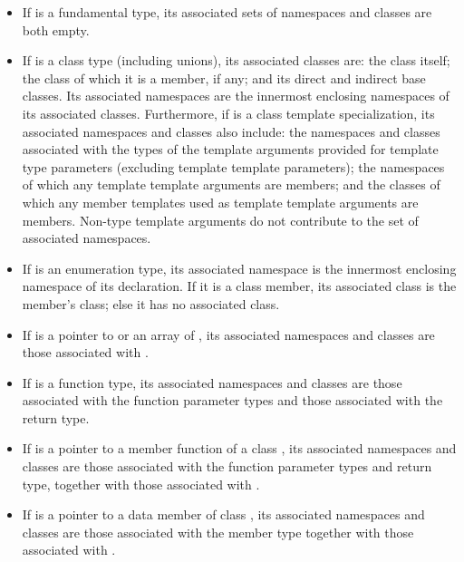 \begin{itemize}
\item If  is a fundamental type, its associated sets of
namespaces and classes are both empty.

\item If  is a class type (including unions), its associated
classes are: the class itself; the class of which it is a member, if
any; and its direct and indirect base classes. Its associated namespaces
are the innermost enclosing namespaces of its associated classes.
Furthermore, if  is a class template specialization, its
associated namespaces and classes also include: the namespaces and
classes associated with the types of the template arguments provided for
template type parameters (excluding template template parameters); the
namespaces of which any template template arguments are members; and the
classes of which any member templates used as template template
arguments are members. \enternote Non-type template arguments do not
contribute to the set of associated namespaces.\exitnote

\item If  is an enumeration type, its associated namespace is
the innermost enclosing namespace of its declaration. If it is a class member, its
associated class is the member's class; else it has no associated class.

\item If  is a pointer to  or an array of ,
its associated namespaces and classes are those associated with
.

\item If  is a function type, its associated namespaces and
classes are those associated with the function parameter types and those
associated with the return type.

\item If  is a pointer to a member function of a class
, its associated namespaces and classes are those associated
with the function parameter types and return type, together with those
associated with .

\item If  is a pointer to a data member of class , its
associated namespaces and classes are those associated with the member
type together with those associated with .

\end{itemize}

